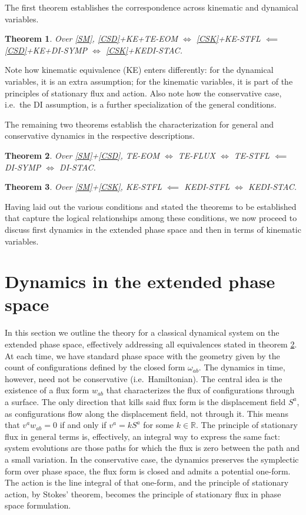 \documentclass[nofootinbib,aps,pre]{revtex4-2}
\newtheorem{theorem}{Theorem}
\begin{document}
The first theorem establishes the correspondence across kinematic and dynamical variables.
\begin{theorem}\label{thrm:bridge}
	Over \ref{SM}, \ref{CSD}+KE+TE-EOM $\iff$ \ref{CSK}+KE-STFL $\impliedby$ \ref{CSD}+KE+DI-SYMP $\iff$ \ref{CSK}+KEDI-STAC.
\end{theorem}
Note how kinematic equivalence (KE) enters differently: for the dynamical variables, it is an extra assumption; for the kinematic variables, it is part of the principles of stationary flux and action. Also note how the conservative case, i.e.~the DI assumption, is a further specialization of the general conditions.

The remaining two theorems establish the characterization for general and conservative dynamics in the respective descriptions.
\begin{theorem}\label{thrm:dyn}
	Over \ref{SM}+\ref{CSD}, TE-EOM $\iff$ TE-FLUX $\iff$ TE-STFL $\impliedby$ DI-SYMP $\iff$ DI-STAC.
\end{theorem}
\begin{theorem}\label{thrm:kin}
	Over \ref{SM}+\ref{CSK}, KE-STFL $\impliedby$ KEDI-STFL $\iff$ KEDI-STAC.
\end{theorem}

Having laid out the various conditions and stated the theorems to be established that capture the logical relationships among these conditions, we now proceed to discuss first dynamics in the extended phase space and then in terms of kinematic variables.

\section{Dynamics in the extended phase space}
\label{sec:dynamicalvar}

In this section we outline the theory for a classical dynamical system on the extended phase space, effectively addressing all equivalences stated in theorem \ref{thrm:dyn}. At each time, we have standard phase space with the geometry given by the count of configurations defined by the closed form $\omega_{ab}$. The dynamics in time, however, need not be conservative (i.e.~Hamiltonian). The central idea is the existence of a flux form $w_{ab}$ that characterizes the flux of configurations through a surface. The only direction that kills said flux form is the displacement field $S^a$, as configurations flow along the displacement field, not through it. This means that $v^a w_{ab} = 0$ if and only if $v^a = k S^a$ for some $k \in \mathbb{R}$. The principle of stationary flux in general terms is, effectively, an integral way to express the same fact: system evolutions are those paths for which the flux is zero between the path and a small variation. In the conservative case, the dynamics preserves the symplectic form over phase space, the flux form is closed and admits a potential one-form. The action is the line integral of that one-form, and the principle of stationary action, by Stokes' theorem, becomes the principle of stationary flux in phase space formulation.
\end{document}
